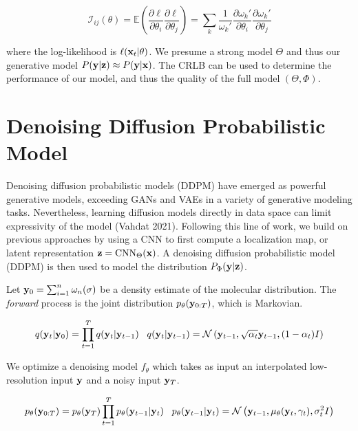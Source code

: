 \documentclass{article}
\begin{document}
\begin{equation}
\mathcal{I}_{ij}(\theta) = \mathbb{E}\left(\frac{\partial \ell}{\partial\theta_{i}}\frac{\partial\ell}{\partial\theta_{j}}\right) = \sum_{k}\frac{1}{\omega_{k}'}\frac{\partial \omega_{k}'}{\partial\theta_{i}}\frac{\partial \omega_{k}'}{\partial\theta_{j}}
\end{equation}

where the log-likelihood is $\ell (\bold{x}_{t}|\theta) $. We presume a strong model $\Theta$ and thus our generative model $P(\bold{y}|\bold{z})\approx P(\bold{y}|\bold{x})$. The CRLB can be used to determine the performance of our model, and thus the quality of the full model $(\Theta,\Phi)$. 

\section{Denoising Diffusion Probabilistic Model}

Denoising diffusion probabilistic models (DDPM) have emerged as powerful generative models, exceeding GANs and VAEs in a variety of generative modeling tasks. Nevertheless, learning diffusion models directly in data space can limit expressivity of the model (Vahdat 2021). Following this line of work, we build on previous approaches by using a CNN to first compute a localization map, or latent representation $\bold{z} = \mathrm{CNN}_{\Theta}(\bold{x})$. A denoising diffusion probabilistic model (DDPM) is then used to model the distribution $P_{\Phi}(\bold{y}|\bold{z})$. 

Let $\bold{y}_{0} = \sum_{i=1}^{n} \bold{\omega}_{n}(\sigma)$ be a density estimate of the molecular distribution. The \emph{forward} process is the joint distribution $p_{\theta}(\bold{y}_{0:T})$, which is Markovian. 

\begin{equation}
q(\bold{y}_{t}|\bold{y}_{0}) = \prod_{t=1}^{T}q(\bold{y}_{t}|\bold{y}_{t-1}) \;\;\; q(\bold{y}_{t}|\bold{y}_{t-1}) = \mathcal{N}\left(\bold{y}_{t-1},\sqrt{\alpha_{t}}\bold{y}_{t-1},(1-\alpha_{t})I\right)
\end{equation}

We optimize a denoising model $f_{\theta}$ which takes as input an interpolated low-resolution input $\bold{y}$ and a noisy input $\bold{y}_{T}$. 

\begin{equation}
p_{\theta}(\bold{y}_{0:T}) = p_{\theta}(\bold{y}_{T})\prod_{t=1}^{T} p_{\theta}(\bold{y}_{t-1}|\bold{y}_{t}) \;\;\; p_{\theta}(\bold{y}_{t-1}|\bold{y}_{t}) = \mathcal{N}\left(\bold{y}_{t-1},\mu_{\theta}(\bold{y}_{t},\gamma_{t}),\sigma^{2}_{t}I\right)
\end{equation}
\end{document}
